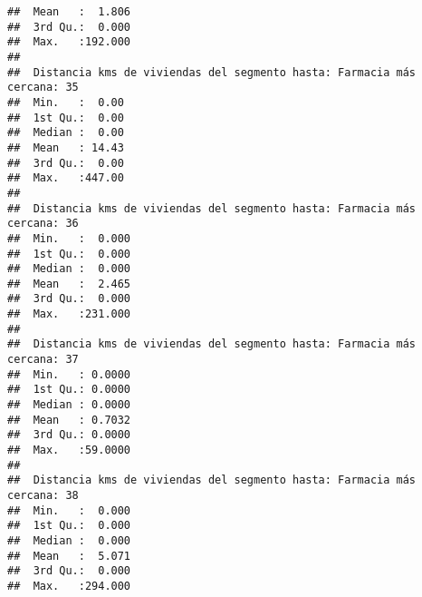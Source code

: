 \documentclass[11pt,]{article}
\begin{document}
\begin{verbatim}
##  Mean   :  1.806                                                        
##  3rd Qu.:  0.000                                                        
##  Max.   :192.000                                                        
##                                                                         
##  Distancia kms de viviendas del segmento hasta: Farmacia más cercana: 35
##  Min.   :  0.00                                                         
##  1st Qu.:  0.00                                                         
##  Median :  0.00                                                         
##  Mean   : 14.43                                                         
##  3rd Qu.:  0.00                                                         
##  Max.   :447.00                                                         
##                                                                         
##  Distancia kms de viviendas del segmento hasta: Farmacia más cercana: 36
##  Min.   :  0.000                                                        
##  1st Qu.:  0.000                                                        
##  Median :  0.000                                                        
##  Mean   :  2.465                                                        
##  3rd Qu.:  0.000                                                        
##  Max.   :231.000                                                        
##                                                                         
##  Distancia kms de viviendas del segmento hasta: Farmacia más cercana: 37
##  Min.   : 0.0000                                                        
##  1st Qu.: 0.0000                                                        
##  Median : 0.0000                                                        
##  Mean   : 0.7032                                                        
##  3rd Qu.: 0.0000                                                        
##  Max.   :59.0000                                                        
##                                                                         
##  Distancia kms de viviendas del segmento hasta: Farmacia más cercana: 38
##  Min.   :  0.000                                                        
##  1st Qu.:  0.000                                                        
##  Median :  0.000                                                        
##  Mean   :  5.071                                                        
##  3rd Qu.:  0.000                                                        
##  Max.   :294.000                                                        

\end{verbatim}
\end{document}
